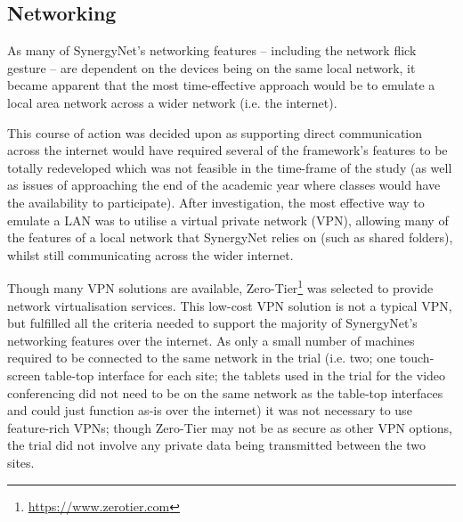 \documentclass[a4paper,11pt]{article}
\begin{document}
\subsection{Networking}

As many of SynergyNet’s networking features -- including the network flick gesture -- are dependent on the devices being on the same local network, it became apparent that the most time-effective approach would be to emulate a local area network across a wider network (i.e. the internet).

This course of action was decided upon as supporting direct communication across the internet would have required several of the framework’s features to be totally redeveloped which was not feasible in the time-frame of the study (as well as issues of approaching the end of the academic year where classes would have the availability to participate).
After investigation, the most effective way to emulate a LAN was to utilise a virtual private network (VPN), allowing many of the features of a local network that SynergyNet relies on (such as shared folders), whilst still communicating across the wider internet.

Though many VPN solutions are available, Zero-Tier\footnote{\url{https://www.zerotier.com}} was selected to provide network virtualisation services.
This low-cost VPN solution is not a typical VPN, but fulfilled all the criteria needed to support the majority of SynergyNet’s networking features over the internet.
As only a small number of machines required to be connected to the same network in the trial (i.e. two; one touch-screen table-top interface for each site; the tablets used in the trial for the video conferencing did not need to be on the same network as the table-top interfaces and could just function as-is over the internet) it was not necessary to use feature-rich VPNs; though Zero-Tier may not be as secure as other VPN options, the trial did not involve any private data being transmitted between the two sites.
\end{document}
